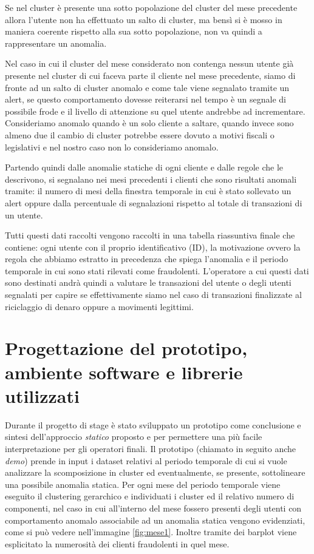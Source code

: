 Se nel cluster è presente una sotto popolazione del cluster del mese precedente allora l'utente non ha effettuato un salto di cluster, ma bensì si è mosso in maniera coerente rispetto alla sua sotto popolazione, non va quindi a rappresentare un anomalia.

Nel caso in cui il cluster del mese considerato non contenga nessun utente già presente nel cluster di cui faceva parte il cliente nel mese precedente, siamo di fronte ad un salto di cluster anomalo e come tale viene segnalato tramite un alert, se questo comportamento dovesse reiterarsi nel tempo è un segnale di possibile frode e il livello di attenzione su quel utente andrebbe ad incrementare.
Consideriamo anomalo quando è un solo cliente a saltare, quando invece sono almeno due il cambio di cluster potrebbe essere dovuto a motivi fiscali o legislativi e nel nostro caso non lo consideriamo anomalo.

Partendo quindi dalle anomalie statiche di ogni cliente e dalle regole che le descrivono, si segnalano nei mesi precedenti i clienti che sono risultati anomali tramite: il numero di mesi della finestra temporale in cui è stato sollevato un alert oppure dalla percentuale di segnalazioni rispetto al totale di transazioni di un utente.

Tutti questi dati raccolti vengono raccolti in una tabella riassuntiva finale che contiene: ogni utente con il proprio identificativo (ID), la motivazione ovvero la regola che abbiamo estratto in precedenza che spiega l'anomalia e il periodo temporale in cui sono stati rilevati come fraudolenti. L’operatore a cui questi dati sono destinati andrà quindi a valutare le transazioni del utente o degli utenti segnalati per capire se effettivamente siamo nel caso di transazioni finalizzate al riciclaggio di denaro oppure a movimenti legittimi. 



\section{Progettazione del prototipo, ambiente software e librerie utilizzati}

Durante il progetto di stage è stato sviluppato un prototipo come conclusione e sintesi dell'approccio \textit{statico} proposto e per permettere una più facile interpretazione per gli operatori finali. Il prototipo (chiamato in seguito anche \textit{demo}) prende in input i dataset relativi al periodo temporale di cui si vuole analizzare la scomposizione in cluster ed eventualmente, se presente, sottolineare una possibile anomalia statica. 
Per ogni mese del periodo temporale viene eseguito il clustering gerarchico e individuati i cluster ed il relativo numero di componenti, nel caso in cui all'interno del mese fossero presenti degli utenti con comportamento anomalo associabile ad un anomalia statica vengono evidenziati, come si può vedere nell'immagine \ref{fig:mese1}. Inoltre tramite dei barplot viene esplicitato la numerosità dei clienti fraudolenti in quel mese.

